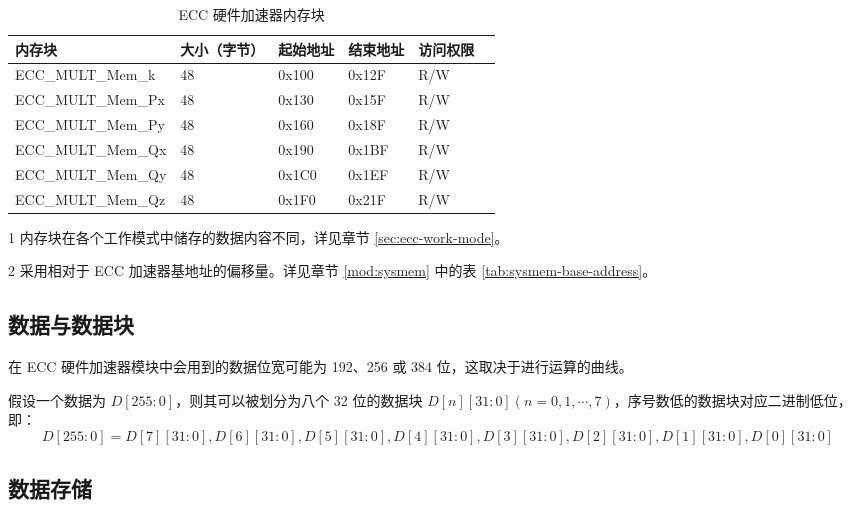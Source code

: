 \documentclass[main\_\_CN.tex]{subfiles}
\begin{document}
\begin{table}[H]
    \centering
    \caption{ECC 硬件加速器内存块} \label{tab:ecc-memory}
    \begin{threeparttable}
    \begin{tabular}{ | l | l | l | l | l | l | }
    \hline
        \rowcolor{lightgray}
        \textbf{内存块}\tnote{1} & \textbf{大小（字节）}  &  \textbf{起始地址}\tnote{2} &  \textbf{结束地址} \tnote{2} & \textbf{访问权限}   \\ \hline
        ECC\_MULT\_Mem\_k    & 48  & 0x100 & 0x12F & R/W \\ \hline
        ECC\_MULT\_Mem\_Px   & 48  & 0x130 & 0x15F & R/W \\ \hline
        ECC\_MULT\_Mem\_Py   & 48  & 0x160 & 0x18F & R/W \\ \hline
        ECC\_MULT\_Mem\_Qx   & 48  & 0x190 & 0x1BF & R/W \\ \hline
        ECC\_MULT\_Mem\_Qy   & 48  & 0x1C0 & 0x1EF & R/W \\ \hline
        ECC\_MULT\_Mem\_Qz   & 48  & 0x1F0 & 0x21F & R/W \\ \hline
    \end{tabular}
    \begin{tablenotes}
        \item[1] 内存块在各个工作模式中储存的数据内容不同，详见章节 \ref{sec:ecc-work-mode}。
        \item[2] 采用相对于 ECC 加速器基地址的偏移量。详见章节 \ref{mod:sysmem} \textit{} 中的表 \ref{tab:sysmem-base-address}。
    \end{tablenotes}
    \end{threeparttable}
\end{table}

\subsection{数据与数据块}

在 ECC 硬件加速器模块中会用到的数据位宽可能为 192、256 或 384 位，这取决于进行运算的曲线。

假设一个数据为 $D[255:0]$，则其可以被划分为八个 32 位的数据块 $D[n][31:0](n=0,1,\cdots,7)$，序号数低的数据块对应二进制低位，即：
\[
D[255:0] = {D[7][31:0],D[6][31:0],D[5][31:0],
D[4][31:0],D[3][31:0],D[2][31:0],D[1][31:0],D[0][31:0]}
\]

\subsection{数据存储}
\end{document}
